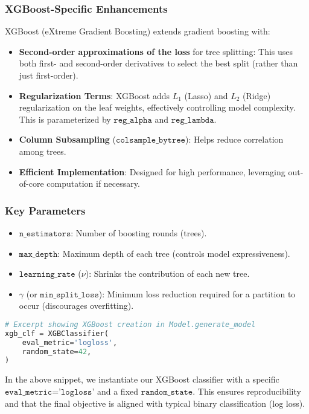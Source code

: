 \documentclass[12pt]{article}
\begin{document}
\subsubsection{XGBoost-Specific Enhancements}
XGBoost (eXtreme Gradient Boosting) extends gradient boosting with:
\begin{itemize}[noitemsep]
    \item \textbf{Second-order approximations of the loss} for tree splitting: This uses both first- and second-order derivatives to select the best split (rather than just first-order).
    \item \textbf{Regularization Terms}: XGBoost adds \(L_1\) (Lasso) and \(L_2\) (Ridge) regularization on the leaf weights, effectively controlling model complexity. This is parameterized by \(\texttt{reg\_alpha}\) and \(\texttt{reg\_lambda}\).
    \item \textbf{Column Subsampling} (\(\texttt{colsample\_bytree}\)): Helps reduce correlation among trees.
    \item \textbf{Efficient Implementation}: Designed for high performance, leveraging out-of-core computation if necessary.
\end{itemize}

\subsubsection{Key Parameters}
\begin{itemize}[noitemsep]
    \item \(\texttt{n\_estimators}\): Number of boosting rounds (trees).
    \item \(\texttt{max\_depth}\): Maximum depth of each tree (controls model expressiveness).
    \item \(\texttt{learning\_rate}\) (\(\nu\)): Shrinks the contribution of each new tree.
    \item \(\gamma\) (or \(\texttt{min\_split\_loss}\)): Minimum loss reduction required for a partition to occur (discourages overfitting).
\end{itemize}

\begin{lstlisting}[language=Python]
# Excerpt showing XGBoost creation in Model.generate_model
xgb_clf = XGBClassifier(
    eval_metric='logloss',
    random_state=42,
)
\end{lstlisting}

\noindent In the above snippet, we instantiate our XGBoost classifier with a specific \(\texttt{eval\_metric='logloss'}\) and a fixed \(\texttt{random\_state}\). This ensures reproducibility and that the final objective is aligned with typical binary classification (log loss).
\end{document}
